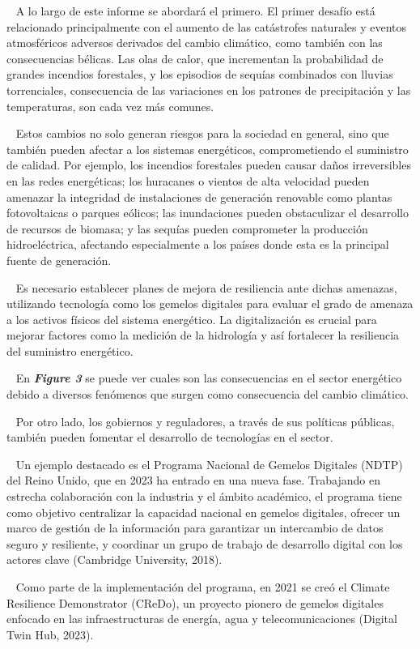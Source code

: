 \documentclass{article}
\begin{document}
~ A lo largo de este informe se abordará el primero. El primer desafío
está relacionado principalmente con el aumento de las catástrofes
naturales y eventos atmosféricos adversos derivados del cambio
climático, como también con las consecuencias bélicas. Las olas de
calor, que incrementan la probabilidad de grandes incendios forestales,
y los episodios de sequías combinados con lluvias torrenciales,
consecuencia de las variaciones en los patrones de precipitación y las
temperaturas, son cada vez más comunes.

~ Estos cambios no solo generan riesgos para la sociedad en general,
sino que también pueden afectar a los sistemas energéticos,
comprometiendo el suministro de calidad. Por ejemplo, los incendios
forestales pueden causar daños irreversibles en las redes energéticas;
los huracanes o vientos de alta velocidad pueden amenazar la integridad
de instalaciones de generación renovable como plantas fotovoltaicas o
parques eólicos; las inundaciones pueden obstaculizar el desarrollo de
recursos de biomasa; y las sequías pueden comprometer la producción
hidroeléctrica, afectando especialmente a los países donde esta es la
principal fuente de generación.

~ Es necesario establecer planes de mejora de resiliencia ante dichas
amenazas, utilizando tecnología como los gemelos digitales para evaluar
el grado de amenaza a los activos físicos del sistema energético. La
digitalización es crucial para mejorar factores como la medición de la
hidrología y así fortalecer la resiliencia del suministro energético.

~ En \textbf{\emph{Figure 3}} se puede ver cuales son las consecuencias
en el sector energético debido a diversos fenómenos que surgen como
consecuencia del cambio climático.

~ Por otro lado, los gobiernos y reguladores, a través de sus políticas
públicas, también pueden fomentar el desarrollo de tecnologías en el
sector.

~ Un ejemplo destacado es el Programa Nacional de Gemelos Digitales
(NDTP) del Reino Unido, que en 2023 ha entrado en una nueva fase.
Trabajando en estrecha colaboración con la industria y el ámbito
académico, el programa tiene como objetivo centralizar la capacidad
nacional en gemelos digitales, ofrecer un marco de gestión de la
información para garantizar un intercambio de datos seguro y resiliente,
y coordinar un grupo de trabajo de desarrollo digital con los actores
clave (Cambridge University, 2018).

~ Como parte de la implementación del programa, en 2021 se creó el
Climate Resilience Demonstrator (CReDo), un proyecto pionero de gemelos
digitales enfocado en las infraestructuras de energía, agua y
telecomunicaciones (Digital Twin Hub, 2023).
\end{document}
